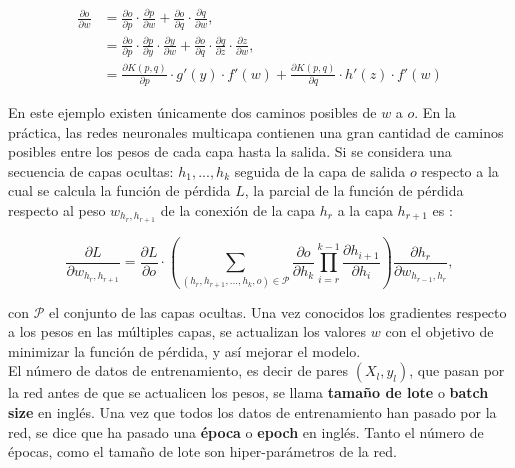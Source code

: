 \begin{align}
  \label{eq:ugly}
\frac{\partial o}{\partial w} &= \frac{\partial o}{\partial p} \cdot \frac{\partial p}{\partial w} +  \frac{\partial o}{\partial q} \cdot \frac{\partial q}{\partial w},  \nonumber \\ 
                              &=  \frac{\partial o}{\partial p}\cdot\frac{\partial p}{\partial y}\cdot\frac{\partial y}{\partial w} + \frac{\partial o}{\partial q}\cdot \frac{\partial q}{\partial z}\cdot \frac{\partial z}{\partial w}, \nonumber \\
                              &= \frac{\partial K(p,q)}{\partial p}\cdot g'(y)\cdot f'(w) + \frac{\partial K(p,q)}{\partial q}\cdot h'(z)\cdot f'(w)
\end{align}

En este ejemplo existen únicamente dos caminos posibles de $w$ a $o$. En la práctica, las redes neuronales multicapa contienen una gran cantidad de caminos posibles entre los pesos de cada capa hasta la salida. Si se considera una secuencia de capas ocultas: $h_1,...,h_k$ seguida de la capa de salida $o$ respecto a la cual se calcula la función de pérdida $L$, la parcial de la función de pérdida respecto al peso $w_{h_r, h_{r+1}}$ de la conexión de la capa $h_{r}$ a la capa $h_{r+1}$ es \cite{Nielsen:2018}:

\begin{equation}
  \label{eq:partialw}
  \frac{\partial L}{\partial w_{h_r, h_{r+1}}} = \frac{\partial L}{\partial o}\cdot \left( \sum_{(h_r,h_{r+1},...,h_k,o)\in \mathcal{P}}\frac{\partial o}{\partial h_k}\prod_{i=r}^{k-1}\frac{\partial h_{i+1}}{\partial h_i}\right) \frac{\partial h_r}{\partial w_{h_{r-1},h_r}},
\end{equation}

\noindent con $\mathcal{P}$ el conjunto de las capas ocultas. Una vez conocidos los gradientes respecto a los pesos en las múltiples capas, se actualizan los valores $w$ con el objetivo de minimizar la función de pérdida, y así mejorar el modelo.\\
El número de datos de entrenamiento, es decir de pares $(X_l,y_l)$, que pasan por la red antes de que se actualicen los pesos, se llama \textbf{tamaño de lote} o \textbf{batch size} en inglés. Una vez que todos los datos de entrenamiento han pasado por la red, se dice que ha pasado una \textbf{época} o \textbf{epoch} en inglés. Tanto el número de épocas, como el tamaño de lote son hiper-parámetros de la red.

